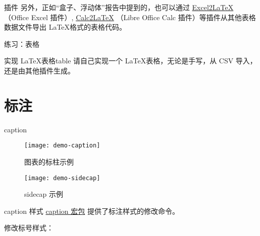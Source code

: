 \documentclass[final]{ctexbeamer}
\begin{document}
\begin{frame}{插件}
另外，正如“盒子、浮动体”报告中提到的，也可以通过 \href{https://github.com/krlmlr/Excel2LaTeX}{Excel2LaTeX} （Office Excel 插件）, \href{http://calc2latex.sourceforge.net/}{Calc2LaTeX} （Libre Office Calc 插件）等插件从其他表格数据文件导出 \LaTeX 格式的表格代码。
\end{frame}


\begin{frame}[fragile]{练习：表格}
\begin{Ex}{实现 \LaTeX 表格}{table}
请自己实现一个 \LaTeX 表格，无论是手写，从 CSV 导入，还是由其他插件生成。
\end{Ex}
\end{frame}



\section{标注}
% 
\begin{frame}[fragile]{caption}
\end{frame}


\begin{frame}
\begin{figure}[]
  \centering
  \texttt{[image: demo-caption]}
  \caption{图表的标柱示例}
  \label{demo-caption}
\end{figure}
\end{frame}


\begin{frame}[fragile]
\end{frame}

\captionsetup[figure]{name=边注图}

\begin{frame}
\begin{figure}[]
  \centering
  \texttt{[image: demo-sidecap]}
  \caption{sidecap 示例}
  \label{demo-sidecap}
\end{figure}
\end{frame}

\captionsetup[figure]{name=图}

\begin{frame}[fragile]{caption 样式}
\href{http://www.ctan.org/pkg/caption}{caption 宏包} \cite{caption} 提供了标注样式的修改命令。
\begin{texlst}[numbers=none]
\usepackage{caption}
\captionsetup[figure]{name=边注图}
\end{texlst}
修改标号样式：
\begin{texlst}[numbers=none]
\renewcommand{\thefigure}{\arabic{section}.\roman{figure}}
\end{texlst}
\end{frame}
\end{document}
